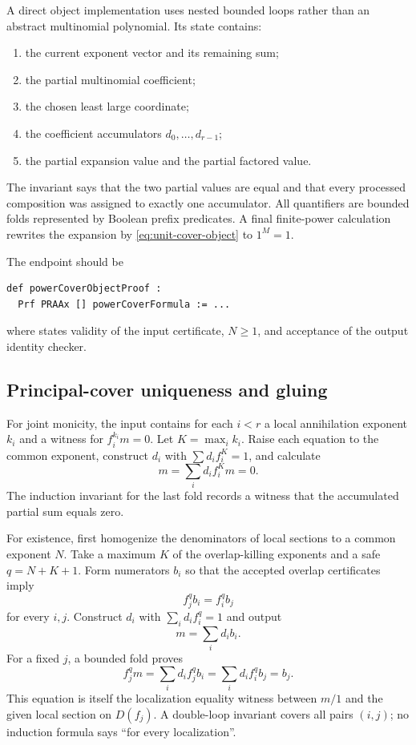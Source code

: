 A direct object implementation uses nested bounded loops rather than an abstract multinomial
polynomial.  Its state contains:
\begin{enumerate}[label=(\roman*)]
\item the current exponent vector and its remaining sum;
\item the partial multinomial coefficient;
\item the chosen least large coordinate;
\item the coefficient accumulators $d_0,\ldots,d_{r-1}$;
\item the partial expansion value and the partial factored value.
\end{enumerate}
The invariant says that the two partial values are equal and that every processed composition was
assigned to exactly one accumulator.  All quantifiers are bounded folds represented by Boolean
prefix predicates.  A final finite-power calculation rewrites the expansion by \eqref{eq:unit-cover-object} to
$1^M=1$.

The endpoint should be
\begin{lstlisting}[language={}] 
def powerCoverObjectProof :
  Prf PRAAx [] powerCoverFormula := ...
\end{lstlisting}
where  states validity of the input certificate, $N\geq1$, and acceptance
of the output identity checker.

\subsection{Principal-cover uniqueness and gluing}

For joint monicity, the input contains for each $i<r$ a local annihilation exponent $k_i$ and a
witness for $f_i^{k_i}m=0$.  Let $K=\max_i k_i$.  Raise each equation to the common exponent,
construct $d_i$ with $\sum d_i f_i^K=1$, and calculate
\[
                    m=\sum_i d_i f_i^K m=0.
\]
The induction invariant for the last fold records a witness that the accumulated partial sum equals
zero.

For existence, first homogenize the denominators of local sections to a common exponent $N$.
Take a maximum $K$ of the overlap-killing exponents and a safe $q=N+K+1$.  Form numerators $b_i$
so that the accepted overlap certificates imply
\[
                         f_j^q b_i=f_i^q b_j                \tag{14.4}
\]
for every $i,j$.  Construct $d_i$ with $\sum_i d_i f_i^q=1$ and output
\[
                              m=\sum_i d_i b_i.              \tag{14.5}\label{eq:glue-formula-object}
\]
For a fixed $j$, a bounded fold proves
\[
 f_j^q m=\sum_i d_i f_j^q b_i
          =\sum_i d_i f_i^q b_j=b_j.
\]
This equation is itself the localization equality witness between $m/1$ and the given local
section on $D(f_j)$.  A double-loop invariant covers all pairs $(i,j)$; no induction formula says
``for every localization''.

